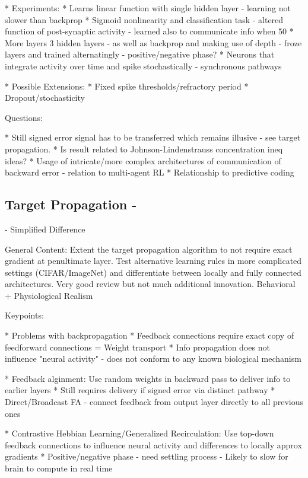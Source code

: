 \documentclass{article}
\theoremstyle{definition}
\begin{document}
* Experiments:
    * Learns linear function with single hidden layer - learning not slower than backprop
    * Sigmoid nonlinearity and classification task - altered function of post-synaptic activity - learned also to communicate info when 50%
    * More layers 3 hidden layers - as well as backprop and making use of depth - froze layers and trained alternatingly - positive/negative phase?
    * Neurons that integrate activity over time and spike stochastically - synchronous pathways

* Possible Extensions:
    * Fixed spike thresholds/refractory period
    * Dropout/stochasticity

Questions:

* Still signed error signal has to be transferred which remains illusive - see target propagation.
* Is result related to Johnson-Lindenstrauss concentration ineq ideas?
* Usage of intricate/more complex architectures of communication of backward error - relation to multi-agent RL
* Relationship to predictive coding


\subsection*{Target Propagation - \citet{lee2015, bartunov2018}}


\citet{bartunov2018} - Simplified Difference

General Content: Extent the target propagation algorithm to not require exact gradient at penultimate layer. Test alternative learning rules in more complicated settings (CIFAR/ImageNet) and differentiate between locally and fully connected architectures. Very good review but not much additional innovation. Behavioral + Physiological Realism


Keypoints:

* Problems with backpropagation
    * Feedback connections require exact copy of feedforward connections = Weight transport
    * Info propagation does not influence "neural activity" - does not conform to any known biological mechanism

* Feedback alginment: Use random weights in backward pass to deliver info to earlier layers
    * Still requires delivery if signed error via distinct pathway
    * Direct/Broadcast FA - connect feedback from output layer directly to all previous ones

* Contrastive Hebbian Learning/Generalized Recirculation: Use top-down feedback connections to influence neural activity and differences to locally approx gradients
    * Positive/negative phase - need settling process - Likely to slow for brain to compute in real time
\end{document}
